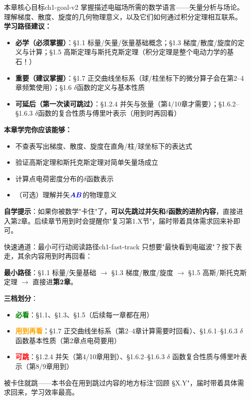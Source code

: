 \documentclass[11pt,a4paper,openany,oneside]{book}
\newcommand{\vecB}{\textcolor{blue}{\vect{B}}}
\newcommand{\vecA}{\textcolor{blue!70!black}{\vect{A}}}
\newcommand{\vect}[1]{\bm{#1}}
\begin{document}
\hypertarget{ch1-goal}{}\begin{insight}{本章核心目标}{ch1-goal-v2}
掌握描述电磁场所需的数学语言——矢量分析与场论。理解梯度、散度、旋度的几何物理意义，以及它们如何通过积分定理相互联系。
\tcblower
\textbf{学习路径建议：}

\begin{itemize}[leftmargin=*]
\item[\textcolor{red}{$\blacksquare$}] \textbf{必学（必须掌握）}：\S1.1 标量/矢量/张量基础概念；\S1.3 梯度/散度/旋度的定义与计算；\S1.5 高斯定理与斯托克斯定理（积分定理是整个电动力学的基石！）
\item[\textcolor{orange}{$\blacksquare$}] \textbf{重要（建议掌握）}：\S1.7 正交曲线坐标系（球/柱坐标下的微分算子会在第2--4章频繁使用）；\S1.6 $\delta$函数的定义与基本性质
\item[\textcolor{green}{$\blacksquare$}] \textbf{可延后（第一次读可跳过）}：\S1.2.4 并矢与张量（第4/10章才需要）；\S1.6.2--\S1.6.3 $\delta$函数的复合性质与傅里叶表示（用到时再回看）
\end{itemize}

\textbf{本章学完你应该能够：}
\begin{itemize}[label=$\square$]
\item 不查表写出梯度、散度、旋度在直角/柱/球坐标下的表达式
\item 验证高斯定理和斯托克斯定理对简单矢量场成立
\item 计算点电荷密度分布的$\delta$函数表示
\item（可选）理解并矢$\vecA\vecB$的物理意义
\end{itemize}

\textbf{自学提示}：如果你被数学"卡住"了，\textbf{可以先跳过并矢和$\delta$函数的进阶内容}，直接进入第2章。后续章节用到时会提醒你"复习第1.X节"，届时带着具体需求回来补即可。
\end{insight}

\begin{tip}{快速通道：最小可行动阅读路径}{ch1-fast-track}
只想要"最快看到电磁波"？按下表走，其余内容用到时再回看：

\textbf{最小路径}：\S1.1 标量/矢量基础 $\to$ \S1.3 梯度/散度/旋度 $\to$ \S1.5 高斯/斯托克斯定理 $\to$ 直接进\textbf{第2章}。

\textbf{三档划分}：
\begin{itemize}[nosep]
\item \textcolor{green}{\textbf{必看}}：\S1.1、\S1.3、\S1.5（后续每一章都在用）
\item \textcolor{orange}{\textbf{用到再看}}：\S1.7 正交曲线坐标系（第2--4章计算需要时回看）、\S1.6.1--\S1.6.3 $\delta$ 函数基本性质（第2章点电荷要用）
\item \textcolor{red}{\textbf{可跳}}：\S1.2.4 并矢（第4/10章用到）、\S1.6.2--\S1.6.3 $\delta$ 函数复合性质与傅里叶表示（第8/9章用到）
\end{itemize}

被卡住就跳——本书会在用到跳过内容的地方标注"回顾 §X.Y"，届时带着具体需求回来，学习效率最高。
\end{tip}
\end{document}
